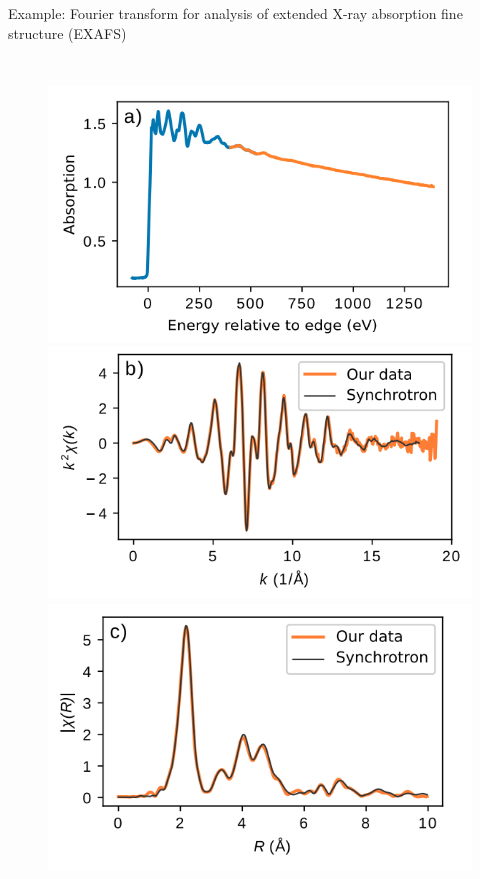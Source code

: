 \documentclass[aspectratio=169]{beamer}
\begin{document}
\begin{frame}{Example: Fourier transform for analysis of extended X-ray absorption fine structure (EXAFS)}
    
    \begin{columns}
    \begin{figure}
        \centering
    \includegraphics[width=\textwidth]{figures/EXAFS-1.png}
    \includegraphics[width=\textwidth]{figures/EXAFS-2.png}
    \includegraphics[width=\textwidth]{figures/EXAFS-3.png}

\end{figure}
\end{columns}
\end{frame}
\end{document}

